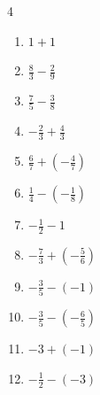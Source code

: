 \begin{multicols}{4}
\begin{enumerate}
  \item $\displaystyle 1 + 1$

        \phantom{$\displaystyle =2$}

  \item $\displaystyle \frac{8}{3} - \frac{2}{9}$


  \item $\displaystyle \frac{7}{5} - \frac{3}{8}$


  \item $\displaystyle -\frac{2}{3} + \frac{4}{3}$


  \item $\displaystyle \frac{6}{7} + \left(-\frac{4}{7}\right)$


\columnbreak %

  \item $\displaystyle \frac{1}{4} - \left(-\frac{1}{8}\right)$


  \item $\displaystyle -\frac{1}{2} - 1$


  \item $\displaystyle -\frac{7}{3} + \left(-\frac{5}{6}\right)$


  \item $\displaystyle -\frac{3}{5} - \left(-1\right)$


  \item $\displaystyle -\frac{3}{5} - \left(-\frac{6}{5}\right)$


  \item $\displaystyle -3 + \left(-1\right)$

        \phantom{$\displaystyle =-4$}

  \item $\displaystyle -\frac{1}{2} - \left(-3\right)$


\end{enumerate}
\end{multicols}
